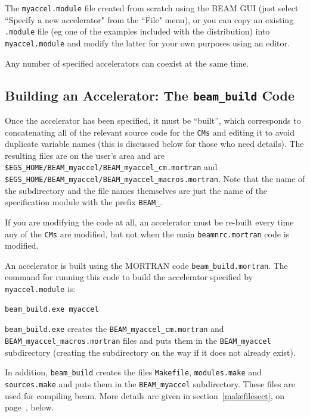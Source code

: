 \documentclass[12pt,twoside]{article}
\begin{document}
The {\tt myaccel.module} file created from scratch using the
BEAM GUI (just select ``Specify a new accelerator" from the ``File"
menu), or you can copy an existing {\tt .module} file (eg one of the
examples included with the distribution) into {\tt myaccel.module}
and modify the latter for your own purposes using an editor.

Any number of specified accelerators can coexist at the same
time.

\subsection{Building an Accelerator: The {\tt beam\_build} Code}
\label{beambuildsect}

Once the accelerator has been specified, it must be ``built'', which
corresponds to concatenating all of the relevant source code for the
\verb+CMs+
and editing it to avoid duplicate variable names
(this is discussed below for
those who need details).  The resulting files are on the user's area and
are
\verb+$EGS_HOME/BEAM_myaccel/BEAM_myaccel_cm.mortran+ and \\
\verb+$EGS_HOME/BEAM_myaccel/BEAM_myaccel_macros.mortran+.
Note that the name of the subdirectory and the file names themselves
 
are just the name of the specification module with the prefix \verb+BEAM_+.

If you are modifying the code at all, an accelerator must be re-built
every time any of the  \verb+CMs+ are modified, but not when the main
\verb+beamnrc.mortran+ code is modified.

An accelerator is built using the MORTRAN code {\tt beam\_build.mortran}.
The command for running this code to build the accelerator specified
by {\tt myaccel.module} is:
\begin{verbatim}
beam_build.exe myaccel
\end{verbatim}
{\tt beam\_build.exe} creates the
{\tt BEAM\_myaccel\_cm.mortran} and {\tt BEAM\_myaccel\_macros.mortran} files
and puts them in the {\tt BEAM\_myaccel} subdirectory (creating the subdirectory
on the way if it does not already exist).

In addition, {\tt beam\_build} creates
the files {\tt Makefile}, {\tt modules.make} and {\tt sources.make} and
puts them in the {\tt BEAM\_myaccel} subdirectory.  These files
are used for compiling beam.
More details
are given in section~\ref{makefilesect}, on
page~\pageref{makefilesect}, below.
\end{document}
